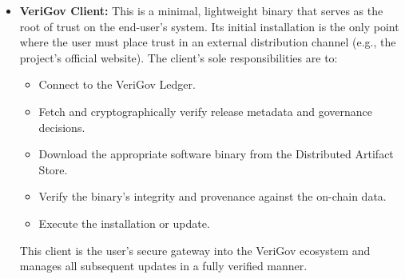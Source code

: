 \documentclass{article}
\begin{document}
\begin{itemize}
\item \textbf{VeriGov Client:} This is a minimal, lightweight binary that serves as the root of trust on the end-user's system. Its initial installation is the only point where the user must place trust in an external distribution channel (e.g., the project's official website). The client's sole responsibilities are to:
\begin{itemize}
\item Connect to the VeriGov Ledger.
\item Fetch and cryptographically verify release metadata and governance decisions.
\item Download the appropriate software binary from the Distributed Artifact Store.
\item Verify the binary's integrity and provenance against the on-chain data.
\item Execute the installation or update.
\end{itemize}
This client is the user's secure gateway into the VeriGov ecosystem and manages all subsequent updates in a fully verified manner.


\end{itemize}
\end{document}
